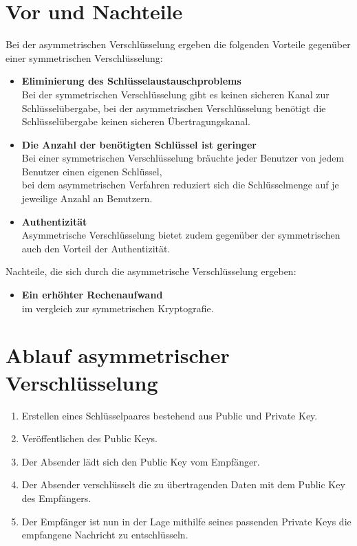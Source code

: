 \section{Vor und Nachteile}
Bei der asymmetrischen Verschlüsselung ergeben die folgenden Vorteile gegenüber einer symmetrischen Verschlüsselung:
\begin{itemize}
    \item \textbf{Eliminierung des Schlüsselaustauschproblems} \\ Bei der symmetrischen Verschlüsselung gibt es keinen sicheren Kanal zur Schlüsselübergabe, bei der asymmetrischen Verschlüsselung benötigt die Schlüsselübergabe keinen sicheren Übertragungskanal.\citep{paar:2016}
    \item \textbf{Die Anzahl der benötigten Schlüssel ist geringer} \\ Bei einer symmetrischen Verschlüsselung bräuchte jeder Benutzer von jedem Benutzer einen eigenen Schlüssel,
    \\bei dem asymmetrischen Verfahren reduziert sich die Schlüsselmenge auf je jeweilige Anzahl an Benutzern.\citep{paar:2016}
    \item \textbf{Authentizität} \\ Asymmetrische Verschlüsselung bietet zudem gegenüber der symmetrischen auch den Vorteil der Authentizität.
\end{itemize}
Nachteile, die sich durch die asymmetrische Verschlüsselung ergeben:

\begin{itemize}
    \item \textbf{Ein erhöhter Rechenaufwand} \\ im vergleich zur symmetrischen Kryptografie.
\end{itemize}

\section{Ablauf asymmetrischer Verschlüsselung}
\begin{enumerate}
    \item Erstellen eines Schlüsselpaares bestehend aus Public und Private Key.
    \item Veröffentlichen des Public Keys.
    \item Der Absender lädt sich den Public Key vom Empfänger.
    \item Der Absender verschlüsselt die zu übertragenden Daten mit dem Public Key des Empfängers.
    \item Der Empfänger ist nun in der Lage mithilfe seines passenden Private Keys die empfangene Nachricht zu entschlüsseln.
\end{enumerate}

